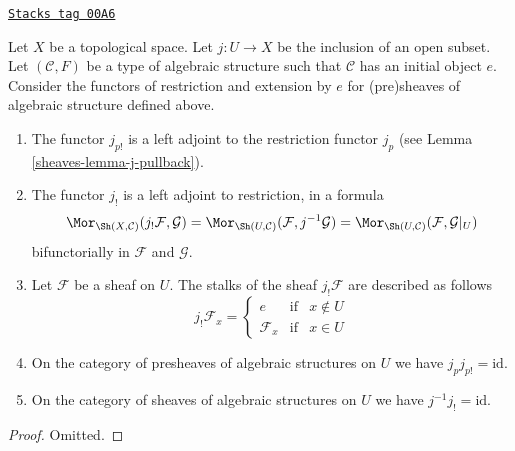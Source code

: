 \begin{lemma}
\label{sheaves-lemma-j-shriek-structures}
\href{https://stacks.math.columbia.edu/tag/00A6}{\texttt{Stacks tag 00A6}}

Let $X$ be a topological space.
Let $j : U \to X$ be the inclusion of an open subset.
Let $(\mathcal{C}, F)$ be a type of algebraic structure
such that $\mathcal{C}$ has an initial object $e$.
Consider the functors of restriction and extension
by $e$ for (pre)sheaves of algebraic structure defined above.
\begin{enumerate}
\item The functor $j_{p!}$ is a left adjoint to the
restriction functor $j_p$ (see Lemma \ref{sheaves-lemma-j-pullback}).
\item The functor $j_!$ is a left adjoint to restriction,
in a formula
$$
\Mor_{\Sh(X, \mathcal{C})}(j_!\mathcal{F}, \mathcal{G})
=
\Mor_{\Sh(U, \mathcal{C})}(\mathcal{F}, j^{-1}\mathcal{G})
=
\Mor_{\Sh(U, \mathcal{C})}(\mathcal{F}, \mathcal{G}|_U)
$$
bifunctorially in $\mathcal{F}$ and $\mathcal{G}$.
\item Let $\mathcal{F}$ be a sheaf on $U$.
The stalks of the sheaf $j_!\mathcal{F}$ are described
as follows
$$
j_{!}\mathcal{F}_x =
\left\{
\begin{matrix}
e & \text{if} & x \not \in U \\
\mathcal{F}_x & \text{if} & x \in U
\end{matrix}
\right.
$$
\item On the category of presheaves of algebraic structures on $U$
we have $j_pj_{p!} = \text{id}$.
\item On the category of sheaves of algebraic structures on $U$
we have $j^{-1}j_! = \text{id}$.
\end{enumerate}
\end{lemma}

\begin{proof}
Omitted.
\end{proof}

